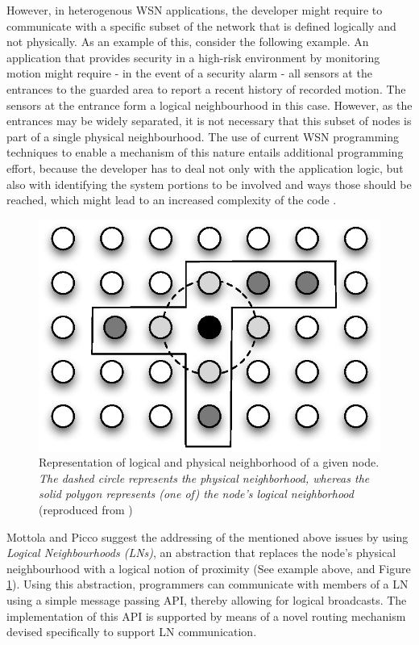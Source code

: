 However, in heterogenous WSN applications, the developer might require to
communicate with a specific subset of the network that is defined logically and
not physically. As an example of this, consider the following example. An
application that provides security in a high-risk environment by monitoring 
motion might require - in the event of a security alarm - all sensors at the
entrances to the guarded area to report a recent history of recorded motion.
The sensors at the entrance form a logical neighbourhood in this case. However,
as the entrances may be widely separated, it is not necessary that this subset
of nodes is part of a single physical neighbourhood. The use of current WSN
programming techniques to enable a mechanism of this nature entails additional
programming effort, because the developer has to deal not only with
the application logic, but also with identifying the system portions to be
involved and ways those should be reached, which might lead to an
increased complexity of the code \cite{mottola_LN:2006}.  

\begin{figure} 
\centering
\includegraphics[scale=0.71]{img/LN_physical_vs_logical.eps} 
\caption[Difference between physical and logical neighborhoods]{Representation 
of logical and physical neighborhood of a given node. \emph{The dashed circle 
represents the physical neighborhood, whereas the solid polygon represents (one 
of) the node's logical neighborhood} (reproduced from
\cite{mottola_LN:2006})}
\label{Fig:LN_physical_vs_logical}
\end{figure} 

Mottola and Picco \cite{mottola_LN:2006} suggest the addressing of the
mentioned above issues by using \emph{Logical Neighbourhoods (LNs)}, an
abstraction that replaces the node's physical neighbourhood with a logical notion of
proximity (See example above, and Figure \ref{Fig:LN_physical_vs_logical}). Using this abstraction, programmers
can communicate
with members of a LN using a simple message passing API,
thereby allowing for logical broadcasts. The implementation of this API is
supported by means of a novel routing mechanism devised specifically to support
LN communication.


